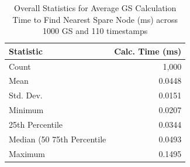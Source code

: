 \begin{table}[htbp]
\centering
\caption{Overall Statistics for Average GS Calculation Time to Find Nearest Spare Node (ms) across 1000 GS and 110 timestamps}
\label{tab:gs_timing_overall_avg_per_gs}
\begin{tabular}{lr}
\toprule
Statistic & Calc. Time (ms) \\
\midrule
Count & 1,000 \\
Mean & 0.0448 \\
Std. Dev. & 0.0151 \\
Minimum & 0.0207 \\
25th Percentile & 0.0344 \\
Median (50%
75th Percentile & 0.0493 \\
Maximum & 0.1495 \\
\bottomrule
\end{tabular}
\end{table}
